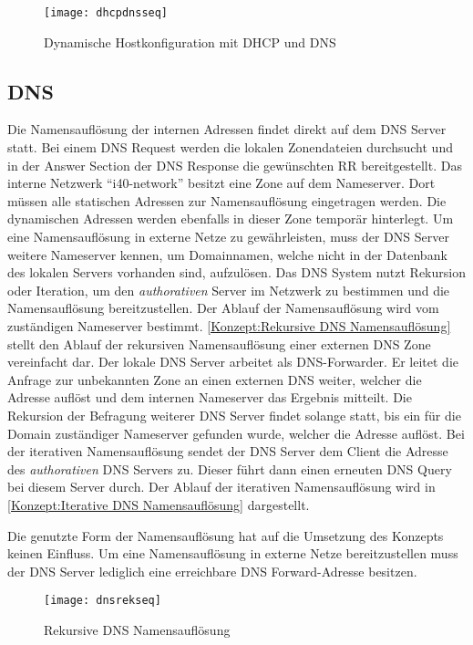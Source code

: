 \begin{figure}[h]
  \centering
  \texttt{[image: dhcpdnsseq]}
  \caption{Dynamische Hostkonfiguration mit DHCP und DNS} 
  \label{Konzept:Dynamische Hostkonfiguration mit DHCP und DNS}
\end{figure}

\subsection{DNS}
Die Namensauflösung der internen Adressen findet direkt auf dem \ac{DNS} Server statt. Bei einem \ac{DNS} Request werden die lokalen Zonendateien durchsucht und in der Answer Section der \ac{DNS} Response die gewünschten \ac{RR} bereitgestellt. Das interne Netzwerk "`i40-network"' besitzt eine Zone auf dem Nameserver. Dort müssen alle statischen Adressen zur Namensauflösung eingetragen werden. Die dynamischen Adressen werden ebenfalls in dieser Zone temporär hinterlegt. Um eine Namensauflösung in externe Netze zu gewährleisten, muss der \ac{DNS} Server weitere Nameserver kennen, um Domainnamen, welche nicht in der Datenbank des lokalen Servers vorhanden sind, aufzulösen. Das \ac{DNS} System nutzt Rekursion oder Iteration, um den \textit{authorativen} Server im Netzwerk zu bestimmen und die Namensauflösung bereitzustellen. Der Ablauf der Namensauflösung wird vom zuständigen Nameserver bestimmt. \autoref{Konzept:Rekursive DNS Namensauflösung} stellt den Ablauf der rekursiven Namensauflösung einer externen \ac{DNS} Zone vereinfacht dar. Der lokale \ac{DNS} Server arbeitet als \ac{DNS}-Forwarder. Er leitet die Anfrage zur unbekannten Zone an einen externen \ac{DNS} weiter, welcher die Adresse auflöst und dem internen Nameserver das Ergebnis mitteilt. Die Rekursion der Befragung weiterer \ac{DNS} Server findet solange statt, bis ein für die Domain zuständiger Nameserver gefunden wurde, welcher die Adresse auflöst. Bei der iterativen Namensauflösung sendet der \ac{DNS} Server dem Client die Adresse des \textit{authorativen} \ac{DNS} Servers zu. Dieser führt dann einen erneuten \ac{DNS} Query bei diesem Server durch. Der Ablauf der iterativen Namensauflösung wird in \autoref{Konzept:Iterative DNS Namensauflösung} dargestellt.

Die genutzte Form der Namensauflösung hat auf die Umsetzung des Konzepts keinen Einfluss. Um eine Namensauflösung in externe Netze bereitzustellen muss der \ac{DNS} Server lediglich eine erreichbare \ac{DNS} Forward-Adresse besitzen.  

\begin{figure}[h]
  \centering
  \texttt{[image: dnsrekseq]}
  \caption{Rekursive DNS Namensauflösung} 
  \label{Konzept:Rekursive DNS Namensauflösung}
\end{figure}

